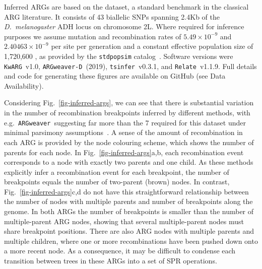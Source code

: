 \documentclass[9pt,twocolumn,twoside]{gsajnl}
\newcommand{\tsinfer}[0]{\texttt{tsinfer}}
\newcommand{\kwarg}[0]{\texttt{KwARG}}
\newcommand{\argweaver}[0]{\texttt{ARGweaver}}
\newcommand{\argweaverD}[0]{\texttt{ARGweaver-D}}
\newcommand{\relate}[0]{\texttt{Relate}}
\begin{document}
Inferred ARGs are based on the \citet{kreitman1983nucleotide} dataset,
a standard benchmark in the classical ARG
literature.
It consists of 43 biallelic SNPs spanning 2.4Kb of the \emph{D.~melanogaster} ADH
locus on chromosome 2L. Where required for inference purposes we assume
mutation and recombination rates of $5.49\times10^{-9}$
and $2.40463\times10^{-9}$ per site per generation
\citep{schrider2013rates,comeron2012many}
and a constant effective population size of 1,720,600 \citep{li2006inferring},
as provided by the \texttt{stdpopsim}
catalog~\citep{adrion2020community,lauterbur2023expanding}.
Software versions were \kwarg~v1.0, \argweaverD~(2019),
\tsinfer~v0.3.1, and \relate~v1.1.9.
Full details and code for generating
these figures are available on GitHub (see Data Availability).

Considering Fig.~\ref{fig-inferred-args}, we can see that
there is substantial variation in the number of recombination breakpoints
inferred by different methods, with e.g.~\argweaver\ suggesting
far more than the 7 required for this dataset under minimal parsimony
assumptions~\citep{song2003parsimonious}.
A sense of the amount of recombination in each ARG is provided by
the node colouring scheme, which shows the number of parents for each node.
In Fig.~\ref{fig-inferred-args}a,b, each recombination event
corresponds to a node with exactly two parents and one child.
As these methods explicitly infer a recombination event for each
breakpoint, the number of breakpoints equals the number of two-parent
(brown) nodes.
In contrast, Fig.~\ref{fig-inferred-args}c,d do not have this
straightforward
relationship between the number of nodes with multiple parents
and number of breakpoints along the genome.
In both ARGs the number of breakpoints is smaller
than the number of multiple-parent ARG nodes, showing
that several multiple-parent nodes must share breakpoint positions.
There are also ARG nodes with multiple parents and multiple children,
where one or more recombinations have been pushed down onto a
more recent node.
As a consequence, it may be difficult to condense each transition between trees
in these ARGs into a set of SPR operations.
\end{document}
